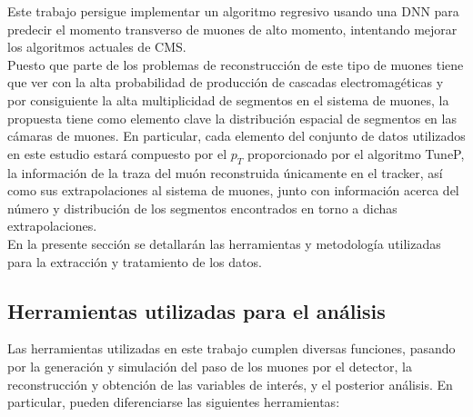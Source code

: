 Este trabajo persigue implementar un algoritmo regresivo usando una DNN para predecir el momento transverso de muones de alto momento, intentando mejorar los algoritmos actuales de CMS. \\

Puesto que parte de los problemas de reconstrucci\'on de este tipo de muones tiene que ver con la alta probabilidad de producci\'on de cascadas electromag\'eticas y por consiguiente la alta multiplicidad de segmentos en el sistema de muones, la propuesta tiene como elemento clave la distribuci\'on espacial de segmentos en las c\'amaras de muones. En particular, cada elemento del conjunto de datos utilizados en este estudio estar\'a compuesto por el $p_{T}$ proporcionado por el algoritmo TuneP, la informaci\'on de la traza del mu\'on reconstruida \'unicamente en el tracker, as\'i como sus extrapolaciones al sistema de muones, junto con informaci\'on acerca del n\'umero y distribuci\'on de los segmentos encontrados en torno a dichas extrapolaciones. \\

En la presente secci\'on se detallar\'an las herramientas y metodolog\'ia utilizadas para la extracci\'on y tratamiento de los datos.


\subsection{Herramientas utilizadas para el an\'alisis}\label{sec:tools}

Las herramientas utilizadas en este trabajo cumplen diversas funciones, pasando por la generaci\'on y simulaci\'on del paso de los muones por el detector, la reconstrucci\'on y obtenci\'on de las variables de inter\'es, y el posterior an\'alisis. En particular, pueden diferenciarse las siguientes herramientas:  


